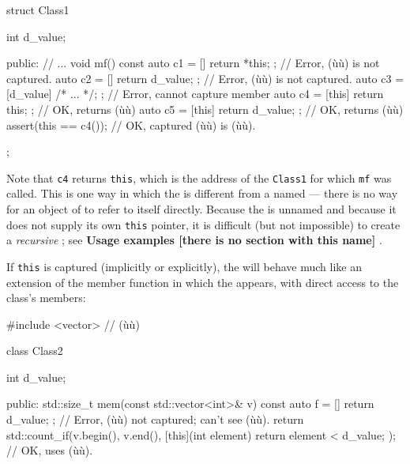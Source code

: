 \begin{emcppslisting}
struct Class1
{
    int d_value;

public:
    // ...
    void mf() const
    {
        auto c1 = []{ return *this; };        // Error, (ù{}ù) is not captured.
        auto c2 = []{ return d_value; };      // Error, (ù{}ù) is not captured.
        auto c3 = [d_value]{ /* ... */; };    // Error, cannot capture member
        auto c4 = [this]{ return this; };     // OK, returns (ù{}ù)
        auto c5 = [this]{ return d_value; };  // OK, returns (ù{}ù)
        assert(this == c4());                 // OK, captured (ù{}ù) is (ù{}ù).
    }
};
\end{emcppslisting}
    

Note that \lstinline!c4! returns \lstinline!this!, which is the address of the
\lstinline!Class1! for which \lstinline!mf! was called. This is one way in
which the  is different from a named
 --- there is no way for an object of
 to refer to itself directly. Because the
 is unnamed and because it does not supply its own
\lstinline!this! pointer, it is difficult (but not impossible) to create a
\emph{recursive} ; see \textbf{Usage examples [there is no section with this name] }.

If \lstinline!this! is captured (implicitly or explicitly), the
 will behave much like an extension of the member
function in which the  appears, with direct
access to the class's members:

\begin{emcppslisting}
#include <vector>  // (ù{}ù)

class Class2
{
    int d_value;

public:
    std::size_t mem(const std::vector<int>& v) const
    {
        auto f = []{ return d_value; };
            // Error, (ù{}ù) not captured; can't see (ù{}ù).
        return std::count_if(v.begin(), v.end(),
                             [this](int element){ return element < d_value; });
            // OK, uses (ù{}ù).
    }
}
\end{emcppslisting}
    

